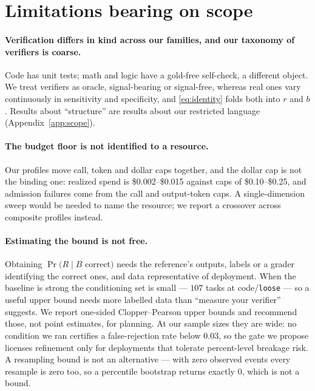 \documentclass{article}
\newcommand{\rrate}{r}
\newcommand{\brate}{b}
\begin{document}
\section{Limitations bearing on scope}
\label{app:scopelim}

\paragraph{Verification differs in kind across our families, and our taxonomy of
verifiers is coarse.} Code has unit tests; math and logic have a gold-free
self-check, a different object. We treat verifiers as oracle, signal-bearing or
signal-free, whereas real ones vary continuously in sensitivity and specificity,
and \eqref{eq:identity} folds both into $\rrate$ and $\brate$. Results about
``structure'' are results about our restricted language
(Appendix~\ref{app:scope}).

\paragraph{The budget floor is not identified to a resource.} Our profiles move
call, token and dollar caps together, and the dollar cap is not the binding one:
realized spend is \$0.002--\$0.015 against caps of \$0.10--\$0.25, and admission
failures come from the call and output-token caps. A single-dimension sweep
would be needed to name the resource; we report a crossover across composite
profiles instead.

\paragraph{Estimating the bound is not free.} Obtaining $\Pr(R \mid B$ correct$)$
needs the reference's outputs, labels or a grader identifying the correct ones,
and data representative of deployment. When the baseline is strong the
conditioning set is small --- $107$ tasks at code/\texttt{loose} --- so a useful
upper bound needs more labelled data than ``measure your verifier'' suggests.
We report one-sided Clopper--Pearson upper bounds and recommend those, not point
estimates, for planning. At our sample sizes they are wide: no condition we ran
certifies a false-rejection rate below $0.03$, so the gate we propose licenses
refinement only for deployments that tolerate percent-level breakage risk. A
resampling bound is not an alternative --- with zero observed events every
resample is zero too, so a percentile bootstrap returns exactly $0$, which is not
a bound.
\end{document}
